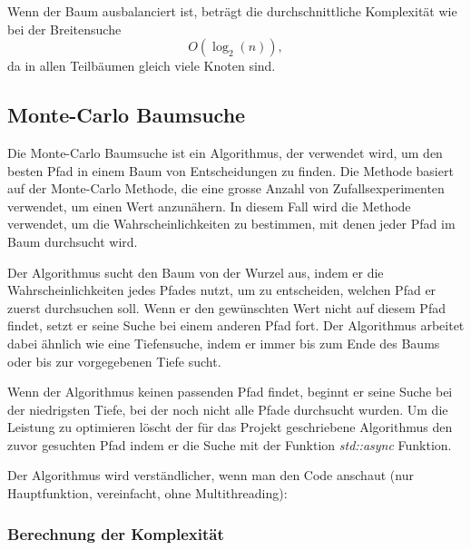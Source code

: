 \documentclass[a4paper,11pt]{article}
\begin{document}
Wenn der Baum ausbalanciert ist, beträgt die durchschnittliche Komplexität wie bei der Breitensuche $$O(\log_2(n)),$$ da in allen Teilbäumen gleich viele Knoten sind.

\subsection{Monte-Carlo Baumsuche}

Die Monte-Carlo Baumsuche ist ein Algorithmus, der verwendet wird, um den besten Pfad in einem Baum von Entscheidungen zu finden. Die Methode basiert auf der Monte-Carlo Methode, die eine grosse Anzahl von Zufallsexperimenten verwendet, um einen Wert anzunähern. In diesem Fall wird die Methode verwendet, um die Wahrscheinlichkeiten zu bestimmen, mit denen jeder Pfad im Baum durchsucht wird.

Der Algorithmus sucht den Baum von der Wurzel aus, indem er die Wahrscheinlichkeiten jedes Pfades nutzt, um zu entscheiden, welchen Pfad er zuerst durchsuchen soll. Wenn er den gewünschten Wert nicht auf diesem Pfad findet, setzt er seine Suche bei einem anderen Pfad fort. Der Algorithmus arbeitet dabei ähnlich wie eine Tiefensuche, indem er immer bis zum Ende des Baums oder bis zur vorgegebenen Tiefe sucht.

Wenn der Algorithmus keinen passenden Pfad findet, beginnt er seine Suche bei der niedrigsten Tiefe, bei der noch nicht alle Pfade durchsucht wurden. Um die Leistung zu optimieren löscht der für das Projekt geschriebene Algorithmus den zuvor gesuchten Pfad indem er die Suche mit der Funktion \emph{std::async} Funktion.

Der Algorithmus wird verständlicher, wenn man den Code anschaut (nur Hauptfunktion, vereinfacht, ohne Multithreading): 



\subsubsection{Berechnung der Komplexität}
\end{document}
